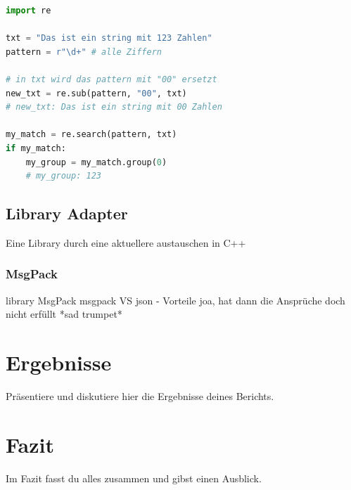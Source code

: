 \documentclass[a4paper, 12pt]{article}
\begin{document}
\begin{lstlisting}[language=Python, caption=Beispiel für regex Syntax:]
import re

txt = "Das ist ein string mit 123 Zahlen"
pattern = r"\d+" # alle Ziffern

# in txt wird das pattern mit "00" ersetzt
new_txt = re.sub(pattern, "00", txt)
# new_txt: Das ist ein string mit 00 Zahlen

my_match = re.search(pattern, txt)
if my_match:
	my_group = my_match.group(0)
	# my_group: 123
\end{lstlisting} %

\subsection{Library Adapter}\label{LibraryAdapter}
Eine Library durch eine aktuellere austauschen in C++

\subsubsection{MsgPack}\label{msgpack}
library MsgPack
msgpack VS json - Vorteile
joa, hat dann die Ansprüche doch nicht erfüllt *sad trumpet*

\newpage
\section{Ergebnisse}
Präsentiere und diskutiere hier die Ergebnisse deines Berichts.

\newpage
\section{Fazit}
Im Fazit fasst du alles zusammen und gibst einen Ausblick.

\newpage


\end{document}
